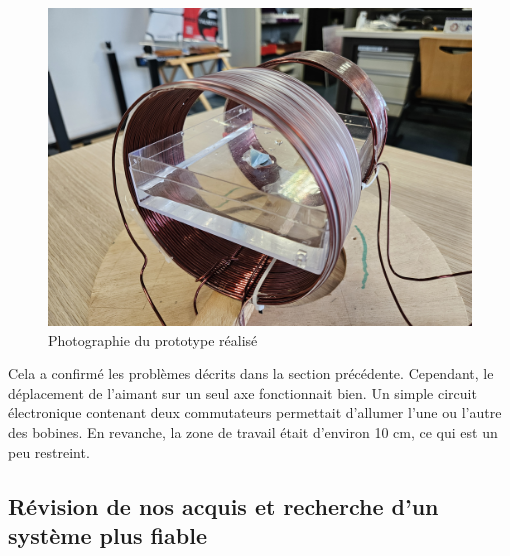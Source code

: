 \documentclass{article}
\begin{document}
\begin{figure}[H]
    \centering
    \includegraphics[width=0.5\linewidth]{Images/proto_test_1.jpg}
    \caption{Photographie du prototype réalisé}
    \label{fig:proto_test_1}
\end{figure}
\noindent
Cela a confirmé les problèmes décrits dans la section précédente. Cependant, le déplacement de l'aimant sur un seul axe fonctionnait bien. Un simple circuit électronique contenant deux commutateurs permettait d'allumer l'une ou l'autre des bobines. En revanche, la zone de travail était d'environ 10 cm, ce qui est un peu restreint.

\subsection{Révision de nos acquis et recherche d'un système plus fiable}
\end{document}

